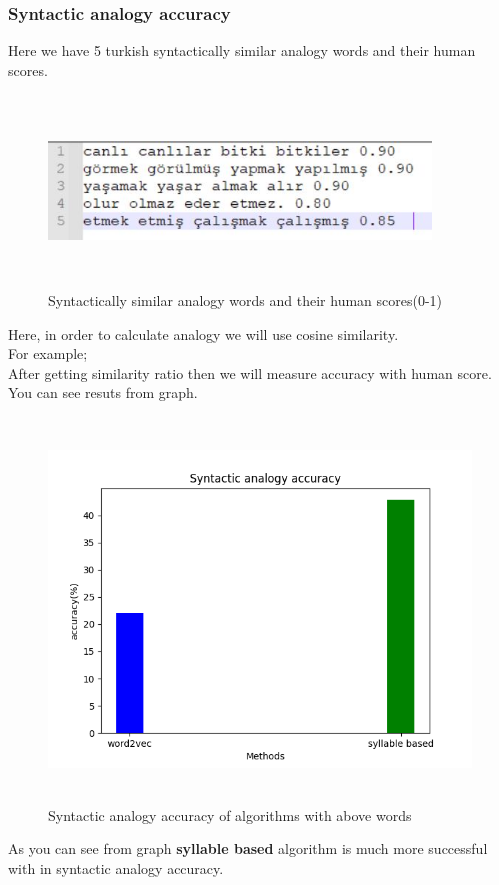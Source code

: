 \documentclass{article}
\begin{document}
\subsubsection{Syntactic analogy accuracy}
Here we have 5 turkish syntactically similar analogy words and their human scores.
\begin{figure}[H]
    \centering
	\includegraphics[width=4in, height=2in]{25.JPG}
	\caption[Optional caption]{Syntactically similar analogy words and their human scores(0-1)}
	\label{}
\end{figure}
Here, in order to calculate analogy we will use cosine similarity. \\
\newline 
For example; \\
\newline
{}
\newline
\newline
\newline
After getting similarity ratio then we will measure accuracy with human score. You can see resuts from graph.
\begin{figure}[H]
    \centering
	\includegraphics[width=6in, height=4in]{syn_anal.png}
	\caption[Optional caption]{Syntactic analogy accuracy of algorithms with above words}
	\label{}
\end{figure}
As you can see from graph \textbf{syllable based} algorithm is much more successful with in syntactic analogy accuracy. 
\end{document}
